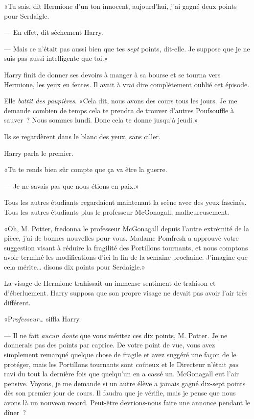 «Tu sais, dit Hermione d'un ton innocent, aujourd'hui, j'ai gagné deux points pour Serdaigle.

--- En effet, dit sèchement Harry.

--- Mais ce n'était pas aussi bien que tes \emph{sept} points, dit-elle. Je suppose que je ne suis pas aussi intelligente que toi.»

Harry finit de donner ses devoirs à manger à sa bourse et se tourna vers Hermione, les yeux en fentes. Il avait à vrai dire complètement oublié cet épisode.

Elle \emph{battit des paupières}. «Cela dit, nous avons des cours tous les jours. Je me demande combien de temps cela te prendra de trouver d'autres Poufsouffle à sauver~? Nous sommes lundi. Donc cela te donne jusqu'à jeudi.»

Ils se regardèrent dans le blanc des yeux, sans ciller.

Harry parla le premier.

«Tu te rends bien sûr compte que ça va être la guerre.

--- Je ne savais pas que nous étions en paix.»

Tous les autres étudiants regardaient maintenant la scène avec des yeux fascinés. Tous les autres étudiants plus le professeur McGonagall, malheureusement.

«Oh, M. Potter, fredonna le professeur McGonagall depuis l'autre extrémité de la pièce, j'ai de bonnes nouvelles pour vous. Madame Pomfresh a approuvé votre suggestion visant à réduire la fragilité des Portillons tournants, et nous comptons avoir terminé les modifications d'ici la fin de la semaine prochaine. J'imagine que cela mérite… disons dix points pour Serdaigle.»

La visage de Hermione trahissait un immense sentiment de trahison et d'éberluement. Harry supposa que son propre visage ne devait pas avoir l'air très différent.

«P\emph{rofesseur…} siffla Harry.

--- Il ne fait \emph{aucun doute} que vous méritez ces dix points, M. Potter. Je ne donnerais pas des points par caprice. De votre point de vue, vous avez simplement remarqué quelque chose de fragile et avez suggéré une façon de le protéger, mais les Portillons tournants sont coûteux et le Directeur n'était \emph{pas} ravi du tout la dernière fois que quelqu'un en a cassé un. McGonagall eut l'air pensive. Voyons, je me demande si un autre élève a jamais gagné dix-sept points dès son premier jour de cours. Il faudra que je vérifie, mais je pense que nous avons là un nouveau record. Peut-être devrions-nous faire une annonce pendant le dîner~?

